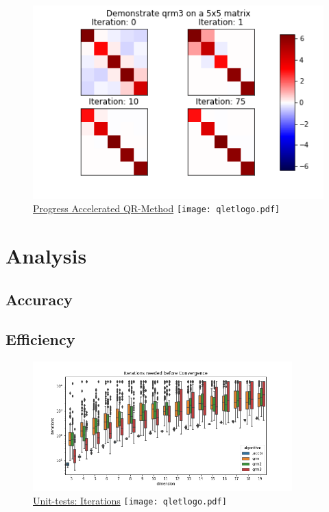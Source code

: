 \documentclass[12pt]{article}
\begin{document}
\begin{figure}
\begin{center}
\caption{\href {https://github.com/thsis/NIS18/tree/master/media/plots}{Progress Accelerated QR-Method}  \protect\texttt{[image: qletlogo.pdf]}}
  \includegraphics[scale=0.6]{../media/plots/qrm3.png}
\end{center}
\end{figure}

\section{Analysis}

\subsection{Accuracy}

\subsection{Efficiency}

\begin{figure}
\begin{center}
\caption{\href {https://github.com/thsis/NIS18/blob/master/tests/tests_eigen.py}{Unit-tests: Iterations}  \protect\texttt{[image: qletlogo.pdf]}}
  \includegraphics[width=\textwidth, height=5cm]{../media/plots/iterations_boxplot.png}
\end{center}
\end{figure}
\end{document}
